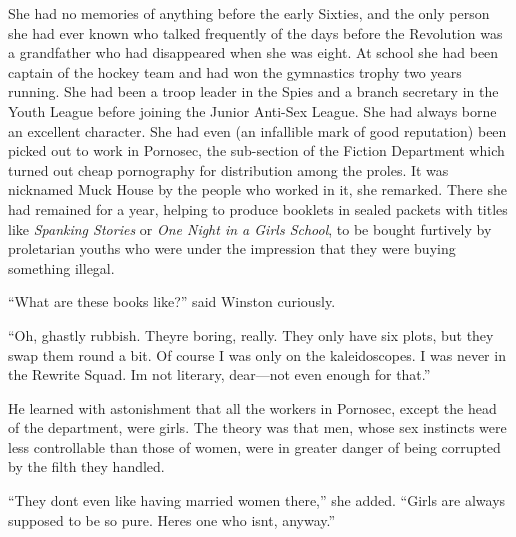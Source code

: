 She had no memories of anything before the early Sixties, and the only
person she had ever known who talked frequently of the days before the
Revolution was a grandfather who had disappeared when she was eight. At
school she had been captain of the hockey team and had won the
gymnastics trophy two years running. She had been a troop leader in the
Spies and a branch secretary in the Youth League before joining the
Junior Anti-Sex League. She had always borne an excellent character. She
had even (an infallible mark of good reputation) been picked out to work
in Pornosec, the sub-section of the Fiction Department which turned out
cheap pornography for distribution among the proles. It was nicknamed
Muck House by the people who worked in it, she remarked. There she had
remained for a year, helping to produce booklets in sealed packets with
titles like \emph{Spanking Stories} or \emph{One Night in a
Girls\textquotesingle{} School}, to be bought furtively by proletarian
youths who were under the impression that they were buying something
illegal.

``What are these books like?'' said Winston curiously.

``Oh, ghastly rubbish. They\textquotesingle re boring, really. They only
have six plots, but they swap them round a bit. Of course I was only on
the kaleidoscopes. I was never in the Rewrite Squad. I\textquotesingle m
not literary, dear---not even enough for that.''

He learned with astonishment that all the workers in Pornosec, except
the head of the department, were girls. The theory was that men, whose
sex instincts were less controllable than those of women, were in
greater danger of being corrupted by the filth they handled.

``They don\textquotesingle t even like having married women there,'' she
added. ``Girls are always supposed to be so pure. Here\textquotesingle s
one who isn\textquotesingle t, anyway.''

